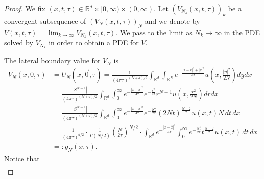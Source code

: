 \documentclass[11pt, twoside, notitlepage]{amsart}
\newcommand\R{\mathbb{R}}
\numberwithin{equation}{section}
\begin{document}
\begin{proof}
We fix $(x,t,\tau) \in \R^d \times [0,\infty) \times (0,\infty).$  Let $(V_{N_k}(x,t,\tau) )_k$ be a convergent subsequence of $(V_N(x,t,\tau) )_N$ and we denote by $V(x,t,\tau)=\lim_{k\to \infty}V_{N_k} (x,t,\tau)$.
 We pass to the limit as $N_k\to \infty$ in the PDE solved by $V_{N_k}$ in order to obtain a PDE for $V$.

The lateral boundary value for $V_N$ is
\begin{align*}
  V_N(x,0,\tau) & =U_N(x,\vec{0},\tau)   =
  \frac{1}{(4 \pi \tau)^{(N+d)/2}}  \int_{\R^d} \int_{\R^N} e^{ - \frac{|x-\overline{x}|^2 + |\overline{y}|^2}{4 \tau} } u(\overline{x}, \frac{|\overline{y}|^2}{2N} ) d \overline{y} d \overline{x} \\
  &=
   \frac{ |S^{N-1}|}{(4 \pi \tau)^{(N+d)/2}}    \int_{\R^d}  \int_0^\infty
   e^{ - \frac{|x-\overline{x}|^2 }{4 \tau} } e^{ - \frac{  r^2}{4 \tau} }  r^{N-1 }u(\overline{x}, \frac{r^2}{2N} )
    d r d \overline{x} \\
   &= \frac{ |S^{N-1}|}{(4 \pi \tau)^{(N+d)/2}}      \int_{\R^d}  \int_0^\infty
   e^{ - \frac{|x-\overline{x}|^2 }{4 \tau} } e^{ - \frac{ N  t}{2 \tau} }  (2Nt)^{\frac{N-2}{2}  }  u(\overline{x}, t )
 N \, dt \, d \overline{x} \\
  &=   \frac{     1    }{ (4 \pi \tau)^{d/2}  } \cdot \frac{1}{ \Gamma(N/2)}
  \left(  \frac{N}{2\tau} \right)^{N/2} \cdot
  \int_{\R^d}  e^{ - \frac{|x-\overline{x}|^2 }{4 \tau} } \int_0^\infty
   e^{ - \frac{ N  t}{2 \tau} }  t^{\frac{N-2}{2}  }  u(\overline{x}, t )
  \, dt \, d \overline{x}  \\
  &=:g_N(x,\tau).
\end{align*}
Notice that
\begin{align}\label{integral-R}

\end{align}
\end{proof}
\end{document}
